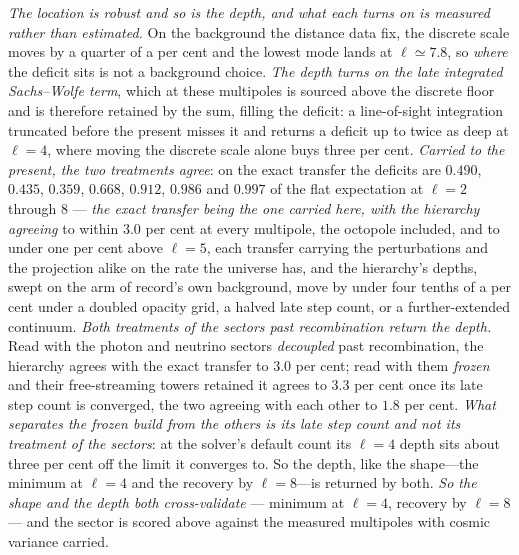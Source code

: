 \documentclass[11pt,a4paper]{article}
\theoremstyle{plain}
\theoremstyle{definition}
\theoremstyle{remark}
\begin{document}
\begin{enumerate}
\emph{The location is robust and so is the depth, and what each turns on is measured rather than estimated.} On the background the distance data fix, the discrete scale moves by a quarter of a per cent
and the lowest mode lands at $\ell\simeq7.8$, so \emph{where} the deficit sits is not a background choice.
\emph{The depth turns on the late integrated Sachs--Wolfe term}, which at these multipoles is sourced above the discrete
floor and is therefore retained by the sum, filling the deficit: a line-of-sight integration truncated before the present
misses it and returns a deficit up to twice as deep at $\ell=4$, where moving the discrete scale alone buys three per cent.
\emph{Carried to the present, the two treatments agree}: on the exact transfer the deficits are $0.490$, $0.435$,
$0.359$, $0.668$, $0.912$, $0.986$ and $0.997$ of the flat expectation at $\ell=2$ through $8$ ---
\emph{the exact transfer being the one carried here, with the hierarchy agreeing} to within $3.0$ per cent at
every multipole, the octopole included, and to under one per cent above $\ell=5$, each transfer carrying the
perturbations and the projection alike on the rate the universe has, and the hierarchy's depths, swept on the arm of record's own background, move by under four tenths of a per cent under a doubled
opacity grid, a halved late step count, or a further-extended continuum. \emph{Both treatments of the sectors past recombination return the depth.} Read with the photon and neutrino
sectors \emph{decoupled} past recombination, the hierarchy agrees with the exact transfer to $3.0$ per cent; read
with them \emph{frozen} and their free-streaming towers retained it agrees to $3.3$ per cent once its late step
count is converged, the two agreeing with each other to $1.8$ per cent. \emph{What separates the frozen build from the others is its late step count and not its treatment of the
sectors}: at the solver's default count its $\ell=4$ depth sits about three per cent off the limit it converges to.
So the depth, like the shape---the minimum at $\ell=4$ and the recovery by $\ell=8$---is returned by both. \emph{So the shape and the depth
both cross-validate} --- minimum at $\ell=4$, recovery by $\ell=8$ --- and the sector is scored above
against the measured multipoles with cosmic variance carried. 


\end{enumerate}
\end{document}
